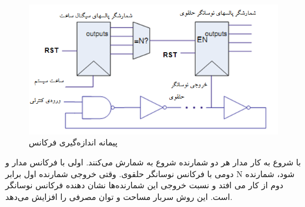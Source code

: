   \begin{figure}
\begin{center}
\includegraphics[scale=1]{figs/fig3-5.png}
\caption{پیمانه اندازه‌گیری فرکانس}
\label{fig3-5}
\end{center}
\end{figure} 


با شروع به کار مدار هر دو شمارنده شروع به شمارش می‌کنند. اولی با فرکانس مدار و دومی با فرکانس نوسانگر حلقوی. وقتی خروجی شمارنده اول برابر N شود، شمارنده دوم از کار می افتد و نسبت خروجی این شمارنده‌ها نشان دهنده فرکانس نوسانگر است. این روش سربار مساحت و توان مصرفی را افزایش می‌دهد.

